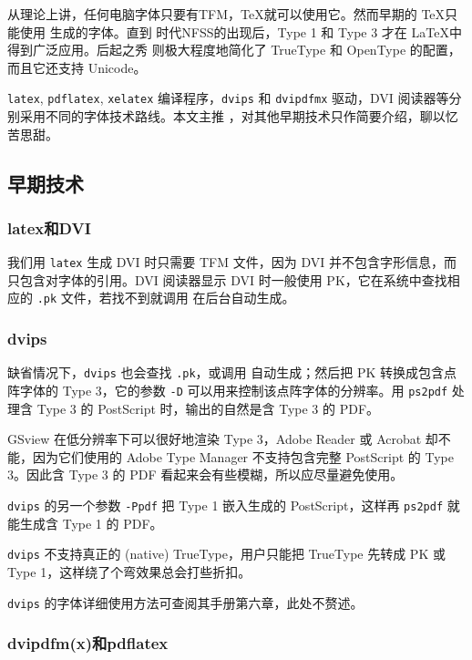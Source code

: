 从理论上讲，任何电脑字体只要有TFM，\TeX 就可以使用它。然而早期的 \TeX 只能使用 \MF 生成的字体。直到 \LaTeXe 时代NFSS的出现后，Type 1 和 Type 3 才在 \LaTeX 中得到广泛应用。后起之秀 \XeTeX 则极大程度地简化了 TrueType 和 OpenType 的配置，而且它还支持 Unicode。

\texttt{latex}, \texttt{pdflatex}, \texttt{xelatex} 编译程序，\texttt{dvips} 和 \texttt{dvipdfmx} 驱动，DVI 阅读器等分别采用不同的字体技术路线。本文主推 \XeLaTeX ，对其他早期技术只作简要介绍，聊以忆苦思甜。

\subsection{早期技术}

\subsubsection{latex和DVI}

我们用 \texttt{latex} 生成 DVI 时只需要 TFM 文件，因为 DVI 并不包含字形信息，而只包含对字体的引用。DVI 阅读器显示 DVI 时一般使用 PK，它在系统中查找相应的 \texttt{.pk} 文件，若找不到就调用 \MF 在后台自动生成。

\subsubsection{dvips}

缺省情况下，\texttt{dvips} 也会查找 \texttt{.pk}，或调用 \MF 自动生成；然后把 PK 转换成包含点阵字体的 Type 3，它的参数 \texttt{-D} 可以用来控制该点阵字体的分辨率。用 \texttt{ps2pdf} 处理含 Type 3 的 PostScript 时，输出的自然是含 Type 3 的 PDF。

GSview 在低分辨率下可以很好地渲染 Type 3，Adobe Reader 或 Acrobat 却不能，因为它们使用的 Adobe Type Manager 不支持包含完整 PostScript 的 Type 3。因此含 Type 3 的 PDF 看起来会有些模糊，所以应尽量避免使用。

\texttt{dvips} 的另一个参数 \texttt{-Ppdf} 把 Type 1 嵌入生成的 PostScript，这样再 \texttt{ps2pdf} 就能生成含 Type 1 的 PDF。

\texttt{dvips} 不支持真正的 (native) TrueType，用户只能把 TrueType 先转成 PK 或 Type 1，这样绕了个弯效果总会打些折扣。

\texttt{dvips} 的字体详细使用方法可查阅其手册\citep{Rokicki_dvips}第六章，此处不赘述。

\subsubsection{dvipdfm(x)和pdflatex}

